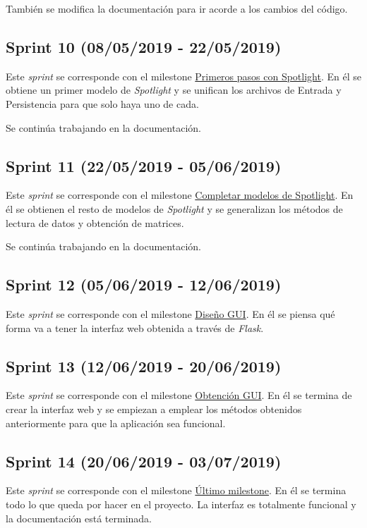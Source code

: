 También se modifica la documentación para ir acorde a los cambios del código.

\subsection{Sprint 10 (08/05/2019 - 22/05/2019)}\label{sprint-10}
Este \textit{sprint} se corresponde con el milestone \href{https://github.com/rnc0011/SistemaRecomendacionTFG/milestone/11}{Primeros pasos con Spotlight}. En él se obtiene un primer modelo de \textit{Spotlight} y se unifican los archivos de Entrada y Persistencia para que solo haya uno de cada.

Se continúa trabajando en la documentación.

\subsection{Sprint 11 (22/05/2019 - 05/06/2019)}\label{sprint-11}
Este \textit{sprint} se corresponde con el milestone \href{https://github.com/rnc0011/SistemaRecomendacionTFG/milestone/12}{Completar modelos de Spotlight}. En él se obtienen el resto de modelos de \textit{Spotlight} y se generalizan los métodos de lectura de datos y obtención de matrices.

Se continúa trabajando en la documentación.

\subsection{Sprint 12 (05/06/2019 - 12/06/2019)}\label{sprint-12}
Este \textit{sprint} se corresponde con el milestone \href{https://github.com/rnc0011/SistemaRecomendacionTFG/milestone/13}{Diseño GUI}. En él se piensa qué forma va a tener la interfaz web obtenida a través de \textit{Flask}.

\subsection{Sprint 13 (12/06/2019 - 20/06/2019)}\label{sprint-13}
Este \textit{sprint} se corresponde con el milestone \href{https://github.com/rnc0011/SistemaRecomendacionTFG/milestone/14}{Obtención GUI}. En él se termina de crear la interfaz web y se empiezan a emplear los métodos obtenidos anteriormente para que la aplicación sea funcional.

\subsection{Sprint 14 (20/06/2019 - 03/07/2019)}\label{sprint-14}
Este \textit{sprint} se corresponde con el milestone \href{https://github.com/rnc0011/SistemaRecomendacionTFG/milestone/15}{Último milestone}. En él se termina todo lo que queda por hacer en el proyecto. La interfaz es totalmente funcional y la documentación está terminada.

